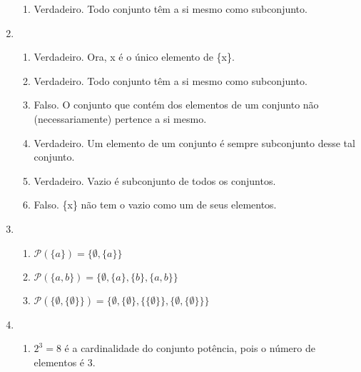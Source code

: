 \documentclass{article}
\begin{document}
\begin{enumerate}
\begin{enumerate}
            \item Verdadeiro. Todo conjunto têm a si mesmo como subconjunto.

        \end{enumerate}

    \item 

        \begin{enumerate}

            \item Verdadeiro. Ora, x é o único elemento de \{x\}.

            \item Verdadeiro. Todo conjunto têm a si mesmo como subconjunto.

            \item Falso. O conjunto que contém dos elementos de um conjunto não (necessariamente) pertence a si mesmo.

            \item Verdadeiro. Um elemento de um conjunto é sempre subconjunto desse tal conjunto.

            \item Verdadeiro. Vazio é subconjunto de todos os conjuntos.

            \item Falso. \{x\} não tem o vazio como um de seus elementos.

        \end{enumerate}

    \item 

        \begin{enumerate}

            \item \( \mathcal{P}(\{a\}) = \{\emptyset,\{a\}\}\)

            \item \( \mathcal{P}(\{a,b\}) = \{\emptyset,\{a\}, \{b\}, \{a,b\}\}\)

            \item \( \mathcal{P}(\{\emptyset,\{\emptyset\}\}) = \{\emptyset,\{\emptyset\}, \{\{\emptyset\}\}, \{\emptyset,\{\emptyset\}\}\}\)

        \end{enumerate}

    \item 

        \begin{enumerate}

            \item \( 2^3 = 8 \) é a cardinalidade do conjunto potência, pois o número de elementos é 3.


\end{enumerate}
\end{enumerate}
\end{document}
